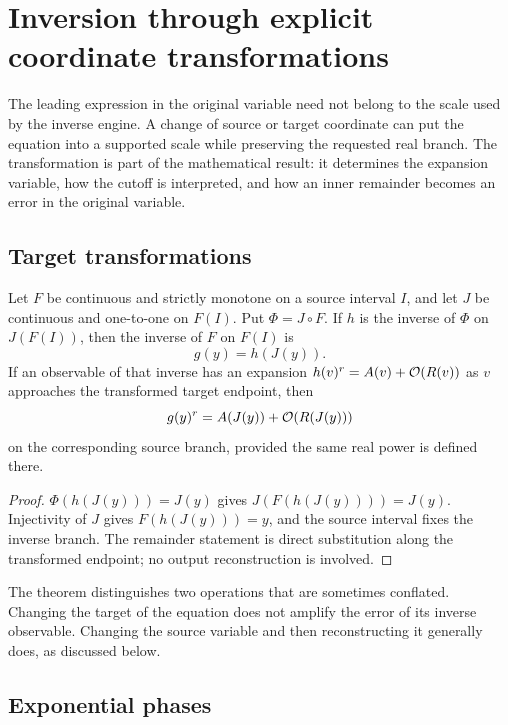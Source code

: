 \section{Inversion through explicit coordinate transformations}
\label{sec:coordinates}

The leading expression in the original variable need not belong to the scale used by the inverse engine. A change of source or target coordinate can put the equation into a supported scale while preserving the requested real branch. The transformation is part of the mathematical result: it determines the expansion variable, how the cutoff is interpreted, and how an inner remainder becomes an error in the original variable.

\subsection{Target transformations}

\begin{theorem}
\label{thm:target-coordinate}
Let $F$ be continuous and strictly monotone on a source interval $I$, and let $J$ be continuous and one-to-one on $F(I)$. Put $\Phi=J\circ F$. If $h$ is the inverse of $\Phi$ on $J(F(I))$, then the inverse of $F$ on $F(I)$ is
\[
 g(y)=h(J(y)).
\]
If an observable of that inverse has an expansion $h(v)^r=A(v)+\mathcal O(R(v))$ as $v$ approaches the transformed target endpoint, then
\[
 g(y)^r=A(J(y))+\mathcal O(R(J(y)))
\]
on the corresponding source branch, provided the same real power is defined there.
\end{theorem}
\begin{proof}
$\Phi(h(J(y)))=J(y)$ gives $J(F(h(J(y))))=J(y)$. Injectivity of $J$ gives $F(h(J(y)))=y$, and the source interval fixes the inverse branch. The remainder statement is direct substitution along the transformed endpoint; no output reconstruction is involved.
\end{proof}

The theorem distinguishes two operations that are sometimes conflated. Changing the target of the equation does not amplify the error of its inverse observable. Changing the source variable and then reconstructing it generally does, as discussed below.

\subsection{Exponential phases}

